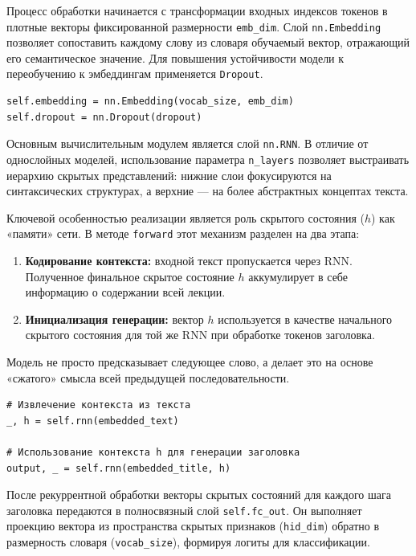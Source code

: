 \documentclass[coursework]{SCWorks}
\begin{document}
    Процесс обработки начинается с трансформации входных индексов токенов в плотные векторы фиксированной размерности \texttt{emb\_dim}. Слой \texttt{nn.Embedding} позволяет сопоставить каждому слову из словаря обучаемый вектор, отражающий его семантическое значение. Для повышения устойчивости модели к переобучению к эмбеддингам применяется \texttt{Dropout}.

    \begin{verbatim}
self.embedding = nn.Embedding(vocab_size, emb_dim)
self.dropout = nn.Dropout(dropout)
    \end{verbatim}

    Основным вычислительным модулем является слой \texttt{nn.RNN}.
    В отличие от однослойных моделей, использование параметра \texttt{n\_layers} позволяет выстраивать иерархию скрытых представлений: нижние слои фокусируются на синтаксических структурах, а верхние — на более абстрактных концептах текста.

    Ключевой особенностью реализации является роль скрытого состояния ($h$) как «памяти» сети. В методе \texttt{forward} этот механизм разделен на два этапа:
    \begin{enumerate}
        \item \textbf{Кодирование контекста:} входной текст пропускается через RNN. Полученное финальное скрытое состояние $h$ аккумулирует в себе информацию о содержании всей лекции.
        \item \textbf{Инициализация генерации:} вектор $h$ используется в качестве начального скрытого состояния для той же RNN при обработке токенов заголовка.
    \end{enumerate}

    Модель не просто предсказывает следующее слово, а делает это на основе «сжатого» смысла всей предыдущей последовательности.

    \begin{verbatim}
# Извлечение контекста из текста
_, h = self.rnn(embedded_text)

# Использование контекста h для генерации заголовка
output, _ = self.rnn(embedded_title, h)
    \end{verbatim}

    После рекуррентной обработки векторы скрытых состояний для каждого шага заголовка передаются в полносвязный слой \texttt{self.fc\_out}. Он выполняет проекцию вектора из пространства скрытых признаков (\texttt{hid\_dim}) обратно в размерность словаря (\texttt{vocab\_size}), формируя логиты для классификации.
\end{document}

